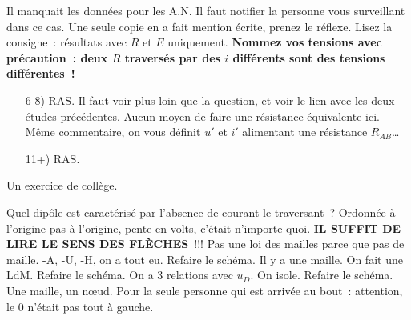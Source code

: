 \documentclass[a4paper, 10pt, final, garamond]{book}
\begin{document}
\setcounter{section}{0}
Il manquait les données pour les A.N. Il faut notifier la personne vous
surveillant dans ce cas. Une seule copie en a fait mention écrite, prenez le
réflexe.
\smallbreak
Lisez la consigne~: résultats avec $R$ et $E$ uniquement. \textbf{Nommez vos
	tensions avec précaution~: deux $R$ traversés par des $i$ différents sont des
	tensions différentes~!}

\begin{enumerate}
	 Tout et n'importe quoi. Points pour $R_1+R_2$ en série, $G_1+G_2$ en
	parallèle. Des schémas fantastiques, dans le sens «~créé par l'imagination~».
	 \textbf{Reprenez les exercices sur les résistances équivalentes}.
	Bien essayé pour les court-circuits, mais non.
	 Je vous avais dit de nommer vos points, et qu'un interrupteur ouvert
	a en général une tension non nulle. Aucune débrouillardise pour traiter ce
	circuit en régime permanent.
	\begin{tcb}*(prop)"bomb"{}
		\begin{tasks}(2)
			\task $u = Ri$ ne vaut \textbf{que pour une résistance~!!}
			\task Interrupteur ouvert $\boxed{\Ra u \neq 0}$ par essence~!!
		\end{tasks}
	\end{tcb}
	 2 bonnes réponses sur 44 copies. \textbf{Ne mettez pas vos tensions
		n'importe où~!!} Une tension est une \textbf{différence de potentiel}, donc
	vous ne pouvez pas simplifier le circuit et dire «~cette tension c'est $v$~».
	 Idem avec les courants. Si vous créez un nouveau nœud, le courant
	représenté n'est plus le même.
	\item[6-8)]{} RAS.
	\setcounter{enumi}{8}
	 Il faut voir plus loin que la question, et voir le lien avec les
	deux études précédentes.
	 Aucun moyen de faire une résistance équivalente ici. Même
	commentaire, on vous définit $u'$ et $i'$ alimentant une résistance $R_{AB}$…
	\item[11+)]{} RAS.
\end{enumerate}

Un exercice de collège.
\begin{enumerate}
	 Quel dipôle est caractérisé par l'absence de courant le traversant~?
	 Ordonnée à l'origine pas à l'origine, pente en volts, c'était
	n'importe quoi.
	 \textbf{IL SUFFIT DE LIRE LE SENS DES FLÈCHES}~!!! Pas une loi des
	mailles parce que pas de maille.
	 -A, -U, -H, on a tout eu.
	 Refaire le schéma. Il y a une maille. On fait une LdM.
	 Refaire le schéma. On a 3 relations avec $u_D$. On isole.
	 Refaire le schéma. Une maille, un nœud.
	 Pour la seule personne qui est arrivée au bout~: attention, le 0
	n'était pas tout à gauche.
\end{enumerate}
\end{document}
